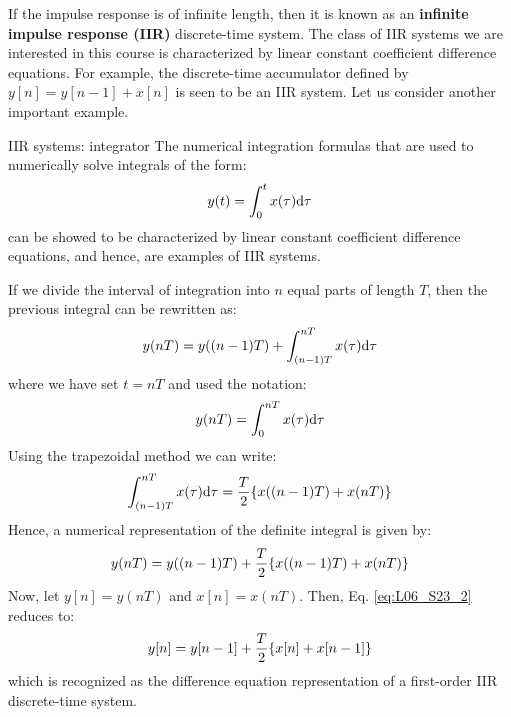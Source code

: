 \documentclass[../../main/main.tex]{subfiles}
\begin{document}
If the impulse response is of infinite length, then it is known as an \textbf{infinite impulse response (IIR)} discrete-time system. The class of IIR systems we are interested in this course is characterized by linear constant coefficient difference equations. For example, the discrete-time accumulator defined by \( y[n] = y[n-1] + x[n] \) is seen to be an IIR system. Let us consider another important example.

\begin{example}{IIR systems: integrator}{}
    The numerical integration formulas that are used to numerically solve integrals of the form:
    \begin{equation}
        y(t)
        =
        \int_{0}^{t} x(\tau) \mathrm{d}{\tau}
        \label{eq:L06_S21_1}
    \end{equation}
    can be showed to be characterized by linear constant coefficient difference equations, and hence, are examples of IIR systems.

    If we divide the interval of integration into \( n \) equal parts of length \( T \), then the previous integral can be rewritten as:
    \begin{equation}
        y(nT)
        =
        y\qty((n-1)T) + \int_{(n-1)T}^{nT} x(\tau) \mathrm{d}{\tau}
        \label{eq:L06_S22_1}
    \end{equation}
    where we have set \( t = nT \) and used the notation:
    \begin{equation}
        y(nT)
        =
        \int_{0}^{nT} x(\tau) \mathrm{d}{\tau}
        \label{eq:L06_S22_2}
    \end{equation}
    Using the trapezoidal method we can write:
    \begin{equation}
        \int_{(n-1)T}^{nT} x(\tau) \mathrm{d}{\tau}
        =
        \frac{T}{2} \qty{x\qty((n-1)T) + x(nT)}
        \label{eq:L06_S23_1}
    \end{equation}
    Hence, a numerical representation of the definite integral is given by:
    \begin{equation}
        y(nT)
        =
        y\qty((n-1)T) + \frac{T}{2} \qty{x\qty((n-1)T) + x(nT)}
        \label{eq:L06_S23_2}
    \end{equation}
    Now, let \( y[n] = y(nT) \) and \( x[n] = x(nT) \). Then, Eq. \ref{eq:L06_S23_2} reduces to:
    \begin{equation}
        y[n]
        =
        y[n-1] + \frac{T}{2} \qty{x[n] + x[n-1]}
        \label{eq:L06_S24_1}
    \end{equation}
    which is recognized as the difference equation representation of a first-order IIR discrete-time system.
\end{example}
\end{document}
